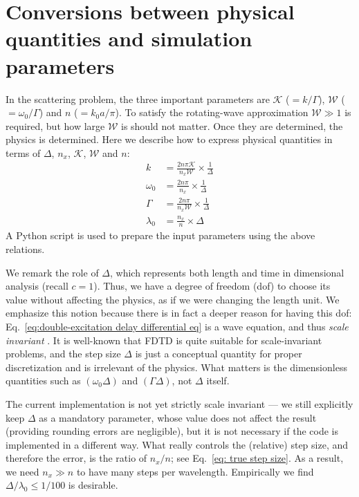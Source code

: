 \documentclass[final,1p,times]{elsarticle}
\begin{document}
\section{Conversions between physical quantities and simulation parameters} 
\label{appen: translation}
In the scattering problem, the three important parameters are $\mathcal{K}$ ($=k/\Gamma$), $\mathcal{W}$ ($=\omega_0/\Gamma$) and $n$ ($=k_0a/\pi$). To satisfy the rotating-wave approximation $\mathcal{W}\gg1$ is required, but how large $\mathcal{W}$ is should not matter. Once they are determined, the physics is determined. Here we describe how to express physical quantities in terms of $\Delta$, $n_x$, $\mathcal{K}$, $\mathcal{W}$ and $n$:
\begin{align}
k&=\frac{2n\pi\mathcal{K}}{n_x\mathcal{W}}\times\frac{1}{\Delta}\\
\omega_0&=\frac{2n\pi}{n_x}\times\frac{1}{\Delta}\\
\Gamma&=\frac{2n\pi}{n_x\mathcal{W}}\times\frac{1}{\Delta}\\
\lambda_0&=\frac{n_x}{n}\times\Delta \label{eq: true step size}
\end{align}
A Python script is used to prepare the input parameters using the above relations. 

We remark the role of $\Delta$, which represents both length and time in dimensional analysis (recall $c=1$). Thus, we have a degree of freedom (dof) to choose its value without affecting the physics, as if we were changing the length unit. We emphasize this notion because 
there is in fact a deeper reason for having this dof: Eq.~\eqref{eq:double-excitation delay differential eq} is a wave equation, and thus \emph{scale invariant} \cite{PhotonicCrystalBook}. It is well-known that FDTD is quite suitable for scale-invariant problems, and the step size $\Delta$ is just a conceptual quantity for proper discretization and is irrelevant of the physics. 
What matters is the dimensionless quantities such as $(\omega_0\Delta)$ and $(\Gamma\Delta)$, not $\Delta$ itself. 

The current implementation is not yet strictly scale invariant --- we still explicitly keep $\Delta$ as a mandatory parameter, whose value does not affect the result (providing rounding errors are negligible), but it is not necessary if the code is implemented in a different way. What really controls the (relative) step size, and therefore the error, is the ratio of $n_x/n$; see Eq.~\eqref{eq: true step size}. As a result, we need $n_x\gg n$ to have many steps per wavelength. Empirically we find $\Delta/\lambda_0\leq1/100$ is desirable.
\end{document}
